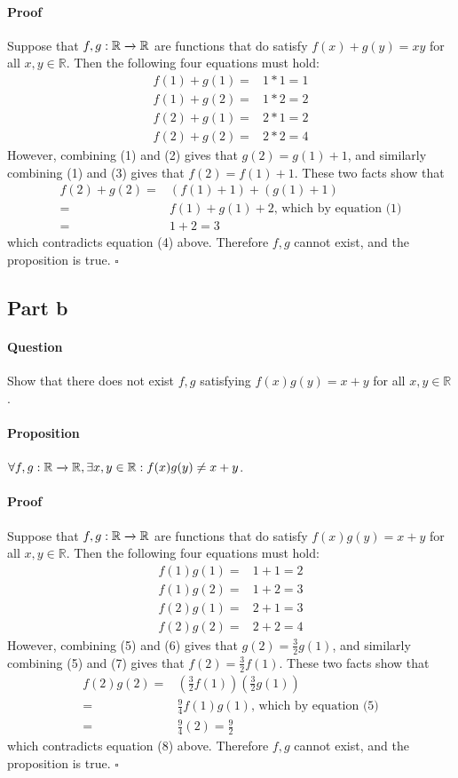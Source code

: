 \documentclass{article}
\begin{document}
\paragraph{Proof}
Suppose that $f, g: \mathbb{R}\xrightarrow{}\mathbb{R}$ are functions that do satisfy $f(x) + g(y) = xy$ for all $x, y\in \mathbb{R}$. Then the following four equations must hold:
\begin{align}
    f(1) + g(1) =& 1*1 = 1\\
    f(1) + g(2) =& 1*2 = 2\\
    f(2) + g(1) =& 2*1 = 2\\
    f(2) + g(2) =& 2*2 = 4
\end{align}
\noindent However, combining (1) and (2) gives that $g(2) = g(1) + 1$, and similarly combining (1) and (3) gives that $f(2) = f(1) + 1$. These two facts show that
\begin{align*}
    f(2) + g(2) =& (f(1) + 1)+ (g(1) + 1)\\
    =& f(1) + g(1) + 2 \textrm{, which by equation (1)}\\
    =& 1+2 = 3
\end{align*}
\noindent which contradicts equation (4) above. Therefore $f, g$ cannot exist, and the proposition is true. $\square$
\subsection{Part b}
\paragraph{Question}
Show that there does not exist $f, g$ satisfying $f(x)g(y) = x + y$ for all $x,y \in \mathbb{R}$.
\paragraph{Proposition} $\forall f,g: \mathbb{R}\xrightarrow{}\mathbb{R}, \exists x,y \in \mathbb{R} : f(x)g(y)\neq x+y$.
\vspace{-10pt}
\paragraph{Proof}
Suppose that $f, g: \mathbb{R}\xrightarrow{}\mathbb{R}$ are functions that do satisfy $f(x)g(y) = x+y$ for all $x, y \in \mathbb{R}$. Then the following four equations must hold:
\begin{align}
    f(1)g(1) =& 1+1 = 2\\
    f(1)g(2) =& 1+2 = 3\\
    f(2)g(1) =& 2+1 = 3\\
    f(2)g(2) =& 2+2 = 4
\end{align}
\noindent However, combining (5) and (6) gives that $g(2) = \frac{3}{2}g(1)$, and similarly combining (5) and (7) gives that $f(2) = \frac{3}{2}f(1)$. These two facts show that
\begin{align*}
    f(2)g(2) =& \left(\frac{3}{2}f(1)\right)\left(\frac{3}{2}g(1)\right)\\
    =& \frac{9}{4}f(1)g(1)\textrm{, which by equation (5)}\\
    =& \frac{9}{4}(2) = \frac{9}{2}
\end{align*}
\noindent which contradicts equation (8) above. Therefore $f, g$ cannot exist, and the proposition is true. $\square$
\end{document}
